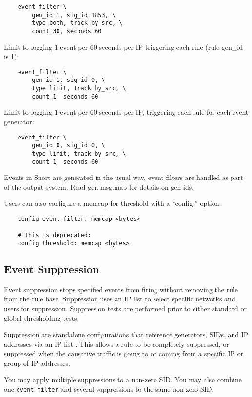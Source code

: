\documentclass[english]{report}
\begin{document}
\begin{verbatim}
    event_filter \
        gen_id 1, sig_id 1853, \
        type both, track by_src, \
        count 30, seconds 60
\end{verbatim}

Limit to logging 1 event per 60 seconds per IP triggering each rule (rule
gen\_id is 1):

\begin{verbatim}
    event_filter \
        gen_id 1, sig_id 0, \
        type limit, track by_src, \
        count 1, seconds 60
\end{verbatim}

Limit to logging 1 event per 60 seconds per IP, triggering each rule for each
event generator:

\begin{verbatim}
    event_filter \
        gen_id 0, sig_id 0, \
        type limit, track by_src, \
        count 1, seconds 60
\end{verbatim}

Events in Snort are generated in the usual way, event filters are handled as
part of the output system. Read gen-msg.map for details on gen ids.

Users can also configure a memcap for threshold with a ``config:'' option:

\begin{verbatim}
    config event_filter: memcap <bytes>

    # this is deprecated:
    config threshold: memcap <bytes>
\end{verbatim}

\subsection{Event Suppression}
\label{event_suppression}

Event suppression stops specified events from firing without removing the rule
from the rule base. Suppression uses an IP list to select specific networks and
users for suppression.  Suppression tests are performed prior to either
standard or global thresholding tests.

Suppression are standalone configurations that reference generators, SIDs, and
IP addresses via an IP list . This allows a rule to be completely suppressed,
or suppressed when the causative traffic is going to or coming from a specific
IP or group of IP addresses.

You may apply multiple suppressions to a non-zero SID.  You may also combine
one \texttt{event\_filter} and several suppressions to the same non-zero SID.  
\end{document}
